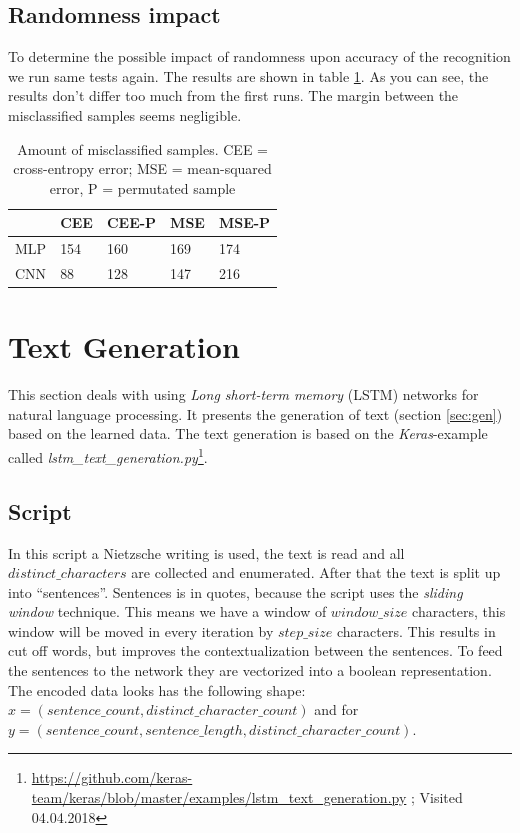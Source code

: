 \documentclass{article}[]
\begin{document}
\subsection{Randomness impact}
To determine the possible impact of randomness upon accuracy of the recognition we run same tests again.
The results are shown in table \ref{table-2}.
As you can see, the results don't differ too much from the first runs.
The margin between the misclassified samples seems negligible.


\begin{table}[H]
	\centering
	\begin{tabular}{|l|l|l|l|l|}
		\hline
		& \cellcolor[HTML]{C0C0C0}CEE & \cellcolor[HTML]{C0C0C0}CEE-P & \cellcolor[HTML]{C0C0C0}MSE & \cellcolor[HTML]{C0C0C0}MSE-P \\ \hline
		\cellcolor[HTML]{C0C0C0}MLP & \cellcolor[HTML]{FFFFFF}154 & 160                           & 169                         & 174                           \\ \hline
		\cellcolor[HTML]{C0C0C0}CNN & 88                          & 128                           & 147                         & 216                           \\ \hline
	\end{tabular}
	\caption{Amount of misclassified samples. CEE = cross-entropy error; MSE = mean-squared error, P = permutated sample}
	\label{table-2}
\end{table}

\section{Text Generation}
\label{sec:seq}
This section deals with using  \emph{Long short-term memory} (LSTM) networks for natural language processing.
It presents the generation of text (section \ref{sec:gen}) based on the learned data.
The text generation is based on the \textit{Keras}-example called \textit{lstm\_text\_generation.py}\footnote{\url{https://github.com/keras-team/keras/blob/master/examples/lstm_text_generation.py} ; Visited 04.04.2018}.


\subsection{Script}
In this script a Nietzsche writing is used, the text is read and all $distinct\_characters$ are collected and enumerated.
After that the text is split up into \enquote{sentences}.
Sentences is in quotes, because the script uses the \emph{sliding window} technique.
This means we have a window of $window\_size$ characters, this window will be moved in every iteration by $step\_size$ characters.
This results in cut off words, but improves the contextualization between the sentences.
To feed the sentences to the network they are vectorized into a boolean representation.
The encoded data looks has the following shape:  $x=(sentence\_count, distinct\_character\_count)$ and for $y=(sentence\_count, sentence\_length, distinct\_character\_count)$.
\end{document}
